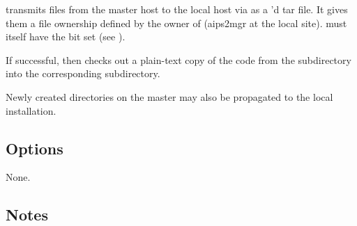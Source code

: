  transmits files from the master host to the local host via
 as a 'd tar file.  It gives them a file ownership
defined by the owner of  (aips2mgr at the local site).  
must itself have the  bit set (see ).
 
If successful,  then checks out a plain-text copy of the code from the
 subdirectory into the corresponding 
subdirectory.
 
Newly created directories on the master may also be propagated to the local
installation.
 
\subsection*{Options}
 
None.

\subsection*{Notes}
 
